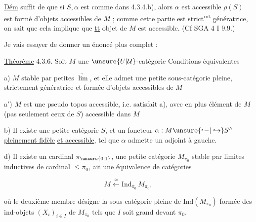 
\uline{Dém}  suffit de   que si $S,\alpha$ est comme dans 4.3.4.b), alors $\alpha$ est accessible   $\rho(S)$  est formé d'objets accessibles de $M$ ; comme cette partie est strict\textsuperscript{mt} génératrice, on sait que cela implique que \uline{tt} objet de $M$ est accessible. (Cf SGA 4 I 9.9.)


Je vais essayer de donner un énoncé plus complet :

\uline{Théorème} 4.3.6. Soit $M$ une $\unsure{U|\mathcal U}$-catégorie Conditions équivalentes

a) $M$ stable par petites $\underrightarrow{\lim}$, et elle admet une petite sous-catégorie pleine,  strictement génératrice  et formée d'objets accessibles de $M$

a$'$) $M$ est une pseudo topos  accessible, i.e. satisfait a), avec en plus \uline{} élément de $M$ (pas seulement ceux de $S$) accessible dans $M$

b) Il existe une petite catégorie $S$, et un foncteur $\alpha:M\unsure{\lhook\joinrel-|\hookrightarrow} S^\wedge$ \uline{pleinement fidèle} \uline{et accessible}, tel que $\alpha$ admette un adjoint à gauche.



d) Il existe un cardinal $\pi_{\unsure{0|1}}$, une petite catégorie $M_{\pi_0}$ stable par limites inductives de cardinal $\leq\pi_0$,   ait une équivalence de catégories

\[
M\overset{\approx}{\longleftarrow}\mathrm{Ind}_{\pi_0}\,M_{\pi_0},
\tag*{(4.3.6.1)}
\]

où le deuxième membre désigne la sous-catégorie pleine de $\mathrm{Ind}(M_{\pi_0})$ formée des  ind-objets $(X_i)_{i\in I}$ de $M_{\pi_0}$ tels que $I$ soit grand devant $\pi_0$.

